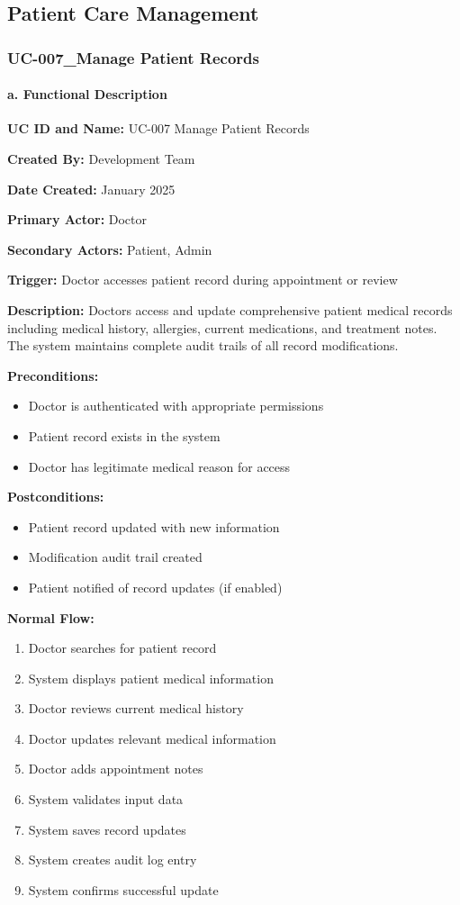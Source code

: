 \documentclass[12pt,a4paper]{article}
\begin{document}
\subsection{Patient Care Management}

\subsubsection{UC-007\_Manage Patient Records}

\paragraph{a. Functional Description}

\textbf{UC ID and Name:} UC-007 Manage Patient Records

\textbf{Created By:} Development Team

\textbf{Date Created:} January 2025

\textbf{Primary Actor:} Doctor

\textbf{Secondary Actors:} Patient, Admin

\textbf{Trigger:} Doctor accesses patient record during appointment or review

\textbf{Description:} Doctors access and update comprehensive patient medical records including medical history, allergies, current medications, and treatment notes. The system maintains complete audit trails of all record modifications.

\textbf{Preconditions:}
\begin{itemize}
    \item Doctor is authenticated with appropriate permissions
    \item Patient record exists in the system
    \item Doctor has legitimate medical reason for access
\end{itemize}

\textbf{Postconditions:}
\begin{itemize}
    \item Patient record updated with new information
    \item Modification audit trail created
    \item Patient notified of record updates (if enabled)
\end{itemize}

\textbf{Normal Flow:}
\begin{enumerate}
    \item Doctor searches for patient record
    \item System displays patient medical information
    \item Doctor reviews current medical history
    \item Doctor updates relevant medical information
    \item Doctor adds appointment notes
    \item System validates input data
    \item System saves record updates
    \item System creates audit log entry
    \item System confirms successful update
\end{enumerate}
\end{document}
